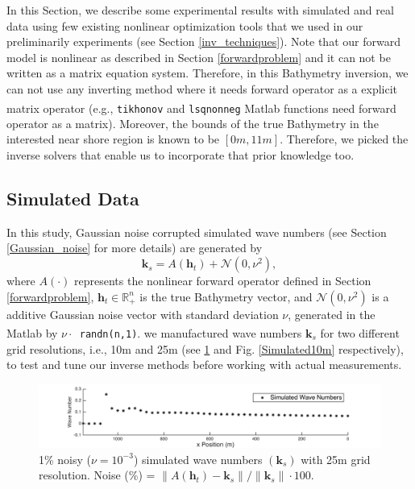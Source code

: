 
In this Section, we describe some experimental results with simulated and real data using few existing nonlinear optimization tools that we used in our preliminarily experiments (see Section \ref{inv_techniques}). Note that our forward model is nonlinear as described in Section \ref{forwardproblem} and it can not be written as a matrix equation system. Therefore, in this Bathymetry inversion, we can not use any inverting method where it needs forward operator as a explicit matrix operator (e.g., \verb|tikhonov| and  \verb|lsqnonneg|     
 Matlab\textsuperscript{\textregistered} functions need forward operator as a matrix). Moreover, the bounds of the true Bathymetry in the interested near shore region is known to be $[0m, 11m]$. Therefore, we picked the inverse solvers that enable us to incorporate that prior knowledge too. 

\subsection{Simulated Data}
In this study, Gaussian noise corrupted simulated wave numbers (see Section \ref{Gaussian_noise} for more details) are generated by 
\begin{equation}
\mathbf{k}_s = A(\mathbf{h}_t) + \mathcal{N}(0, \nu^2),
\end{equation}
where $A(\cdot)$ represents the nonlinear forward operator defined in Section \ref{forwardproblem}, $\mathbf{h}_t \in \mathbb{R}_+^n$ is the true Bathymetry vector, and $\mathcal{N}(0, \nu^2)$ is a additive Gaussian noise vector with standard deviation $\nu$, generated in the Matlab\textsuperscript{\textregistered} by $\nu \cdot $\verb| randn(n,1)|. we manufactured wave numbers $\mathbf{k}_s$ for two different grid resolutions, i.e., 10m and 25m (see \ref{Simulated25m} and Fig. \ref{Simulated10m} respectively), to test and tune our inverse methods before working with actual measurements. 



\begin{figure}[H]
\center
\includegraphics[scale=0.6]{img/simulated_data_k25m.png} 
\caption{1\% noisy ($\nu = 10^{-3}$) simulated wave numbers $(\mathbf{k}_s)$ with 25m grid resolution. Noise (\%) = $\|A(\mathbf{h}_t) -  \mathbf{k}_s\| / \|  \mathbf{k}_s \| \cdot 100$.}
\label{Simulated25m}
\end{figure}

